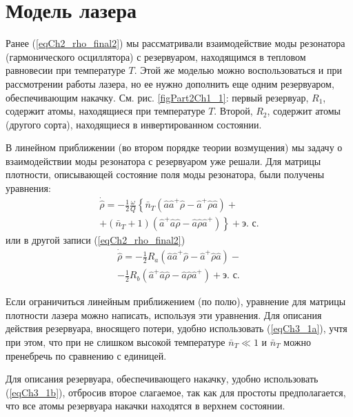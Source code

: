 \section{Модель лазера}

Ранее (\ref{eqCh2_rho_final2}) мы рассматривали взаимодействие моды резонатора
(гармонического осциллятора) с резервуаром, находящимся в тепловом
равновесии при температуре  $T$.  Этой же моделью можно воспользоваться
и при рассмотрении работы лазера, но ее нужно дополнить еще одним
резервуаром, обеспечивающим накачку.  
См. рис. \ref{figPart2Ch1_1}: первый резервуар, $R_1$, содержит атомы,
находящиеся при температуре  $T$.  Второй, $R_2$, содержит атомы (другого
сорта), находящиеся в инвертированном состоянии. 



В линейном приближении (во втором порядке теории возмущения) мы задачу
о взаимодействии моды резонатора с резервуаром уже решали. Для матрицы
плотности, описывающей состояние поля моды резонатора, были получены
уравнения:  
\begin{eqnarray}
\dot{\hat{\rho}} =
- \frac{1}{2}\frac{\omega}{Q}\left\{
\bar{n}_T\left(\hat{a}\hat{a}^{+}\hat{\rho} - 
\hat{a}^{+}\hat{\rho}\hat{a}
\right)\right.
+ 
\nonumber \\
\left.
+ \left(\bar{n}_T + 1\right)
\left(\hat{a}^{+}\hat{a}\hat{\rho} - 
\hat{a}\hat{\rho}\hat{a}^{+}
\right)
\right\}
 + \mbox{э. с.}
\label{eqCh3_1a}
\end{eqnarray}
или в другой записи (\ref{eqCh2_rho_final2})
\begin{eqnarray}
\dot{\hat{\rho}} =
- \frac{1}{2}R_a
\left(\hat{a}\hat{a}^{+}\hat{\rho} - 
\hat{a}^{+}\hat{\rho}\hat{a}
\right)
- 
\nonumber \\
- \frac{1}{2}R_b
\left(\hat{a}^{+}\hat{a}\hat{\rho} - 
\hat{a}\hat{\rho}\hat{a}^{+}
\right)
 + \mbox{э. с.}
\label{eqCh3_1b}
\end{eqnarray}

Если ограничиться линейным приближением (по полю), уравнение для
матрицы плотности лазера можно написать, используя эти уравнения. Для
описания действия резервуара, вносящего потери, удобно использовать
(\ref{eqCh3_1a}), учтя при этом, что при не слишком высокой
температуре $\bar{n}_T \ll 1$  и $\bar{n}_T$
можно пренебречь по сравнению с  единицей.
 
Для описания резервуара, обеспечивающего накачку, удобно использовать
(\ref{eqCh3_1b}), отбросив второе слагаемое, так как для простоты
предполагается, что все атомы резервуара накачки находятся в верхнем
состоянии. 

